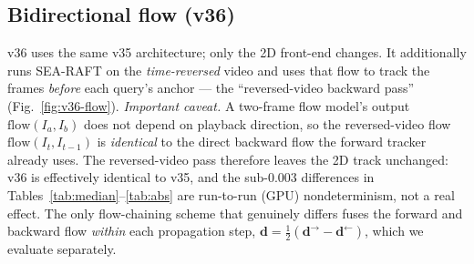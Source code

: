 \documentclass[11pt,a4paper]{article}
\begin{document}
\subsection{Bidirectional flow (v36)}
\label{sec:v36}

v36 uses the same v35 architecture; only the 2D front-end changes. It additionally runs SEA-RAFT
on the \emph{time-reversed} video and uses that flow to track the frames \emph{before} each query's
anchor --- the ``reversed-video backward pass'' (Fig.~\ref{fig:v36-flow}).
\emph{Important caveat.} A two-frame flow model's output $\mathrm{flow}(I_a,I_b)$ does not depend on
playback direction, so the reversed-video flow $\mathrm{flow}(I_t,I_{t-1})$ is \emph{identical} to
the direct backward flow the forward tracker already uses. The reversed-video pass therefore leaves
the 2D track unchanged: v36 is effectively identical to v35, and the sub-$0.003$ differences in
Tables~\ref{tab:median}--\ref{tab:abs} are run-to-run (GPU) nondeterminism, not a real effect. The
only flow-chaining scheme that genuinely differs fuses the forward and backward flow \emph{within}
each propagation step, $\mathbf{d}=\tfrac12(\mathbf{d}^{\rightarrow}-\mathbf{d}^{\leftarrow})$, which
we evaluate separately.
\end{document}
